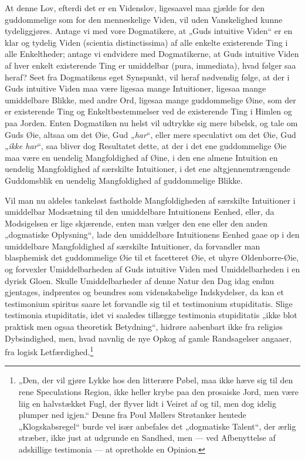 \documentclass[12pt]{book}
\newcommand{\opage}[1]{\marginnote{\footnotesize\textit{[#1]}}}
\begin{document}
At denne Lov, efterdi det er en Videnslov, ligesaavel maa gjælde for den guddommelige som for den
menneskelige Viden, vil uden Vanskelighed kunne tydeliggjøres. Antage vi med vore Dogmatikere, at
„Guds intuitive Viden“ er en klar og tydelig Viden (scientia distinctissima) af alle enkelte
existerende Ting i alle Enkeltheder; antage vi endvidere med Dogmatikerne, at Guds intuitive Viden
af hver enkelt existerende Ting er umiddelbar (pura, immediata), hvad følger saa heraf? Seet fra
Dogmatikens eget Synspunkt, vil heraf nødvendig følge, at der i Guds intuitive Viden maa være
ligesaa mange Intuitioner, ligesaa mange umiddelbare Blikke, med andre Ord, ligesaa mange
guddommelige Øine, som der er existerende Ting og Enkeltbestemmelser ved de existerende Ting i
Himlen og paa Jorden. Enten Dogmatiken nu helst vil udtrykke sig mere bibelsk, og tale om Guds Øie,
altsaa om det Øie, Gud „\emph{har}“, eller mere speculativt om det Øie, Gud „\emph{ikke har}“, saa
bliver dog Resultatet dette, at der i det ene guddommelige Øie maa være en uendelig Mangfoldighed
af Øine, i den ene almene Intuition en uendelig Mangfoldighed af særskilte Intuitioner, i det ene
altgjennemtrængende Guddomsblik en uendelig Mangfoldighed af guddommelige Blikke.

Vil man nu aldeles tankeløst fastholde Mangfoldigheden af særskilte Intuitioner i umiddelbar
Modsætning til den umiddelbare Intuitionens Eenhed, eller, da Modsigelsen er lige skjærende, enten
man vælger den ene eller den anden „dogmatiske Oplysning“, lade den umiddelbare Intuitionens Eenhed
gaae op i den umiddelbare Mangfoldighed af særskilte Intuitioner, da forvandler man blasphemisk det
guddommelige Øie til et facetteret Øie, et uhyre Oldenborre-Øie, og forvexler Umiddelbarheden af
Guds intuitive Viden med Umiddelbarheden
\opage{243} i en dyrisk Gloen. Skulle Umiddelbarheder af denne Natur den Dag idag endnu gjentages, indprentes
og beundres som videnskabelige Indskydelser, da kan et testimonium spiritus saare let forvandle sig
til et testimonium stupiditatis. Slige testimonia stupiditatis, idet vi saaledes tillægge
testimonia stupiditatis „ikke blot praktisk men ogsaa theoretisk Betydning“, hidrøre aabenbart ikke
fra religiøs Dybsindighed, men, hvad navnlig de nye Opkog af gamle Randsagelser angaaer, fra logisk
Letfærdighed.\footnote{„Den, der vil gjøre Lykke hos den litterære Pøbel, maa ikke hæve sig til den
rene Speculations Region, ikke heller krybe paa den prosaiske Jord, men være liig en halvstækket
Fugl, der flyver lidt i Veiret af og til, men dog idelig plumper ned igjen.“ Denne fra Poul Møllers
Strøtanker hentede „Klogskabsregel“ burde vel især anbefales det „dogmatiske Talent“, der ærlig
stræber, ikke just at udgrunde en Sandhed, men --- ved Afbenyttelse af adskillige testimonia --- at
opretholde en Opinion.}
\end{document}
